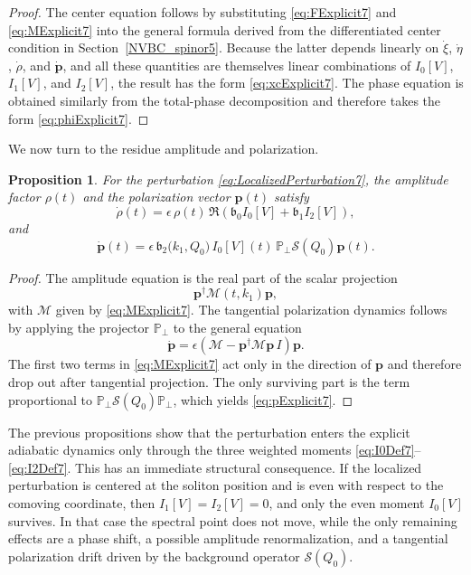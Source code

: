 \documentclass[11pt]{amsart}
\newtheorem{proposition}{Proposition}[section]
\theoremstyle{definition}
\numberwithin{equation}{section}
\begin{document}
\begin{proof}
The center equation follows by substituting \eqref{eq:FExplicit7} and \eqref{eq:MExplicit7} into the general formula derived from the differentiated center condition in Section~\ref{NVBC_spinor5}. Because the latter depends linearly on $\dot\xi$, $\dot\eta$, $\dot\rho$, and $\dot{\mathbf p}$, and all these quantities are themselves linear combinations of $I_0[V]$, $I_1[V]$, and $I_2[V]$, the result has the form \eqref{eq:xcExplicit7}. The phase equation is obtained similarly from the total-phase decomposition and therefore takes the form \eqref{eq:phiExplicit7}.
\end{proof}

We now turn to the residue amplitude and polarization.

\begin{proposition}
For the perturbation \eqref{eq:LocalizedPerturbation7}, the amplitude factor $\rho(t)$ and the polarization vector $\mathbf p(t)$ satisfy
\begin{equation}
\dot{\rho}(t)
=
\epsilon\,\rho(t)\,
\Re\!\left(
\mathfrak{b}_0 I_0[V]
+
\mathfrak{b}_1 I_2[V]
\right),
\label{eq:rhoExplicit7}
\end{equation}
and
\begin{equation}
\dot{\mathbf p}(t)
=
\epsilon\,\mathfrak{b}_2\bigl(k_1,Q_0\bigr)\,I_0[V](t)\,
\mathbb P_\perp \mathcal S(Q_0)\mathbf p(t).
\label{eq:pExplicit7}
\end{equation}
\end{proposition}

\begin{proof}
The amplitude equation is the real part of the scalar projection
\[
\mathbf p^\dagger \mathcal M(t,k_1)\mathbf p,
\]
with $\mathcal M$ given by \eqref{eq:MExplicit7}. The tangential polarization dynamics follows by applying the projector $\mathbb P_\perp$ to the general equation
\[
\dot{\mathbf p}
=
\epsilon\left(
\mathcal M-\mathbf p^\dagger \mathcal M\mathbf p\,I
\right)\mathbf p.
\]
The first two terms in \eqref{eq:MExplicit7} act only in the direction of $\mathbf p$ and therefore drop out after tangential projection. The only surviving part is the term proportional to $\mathbb P_\perp \mathcal S(Q_0)\mathbb P_\perp$, which yields \eqref{eq:pExplicit7}.
\end{proof}

The previous propositions show that the perturbation enters the explicit adiabatic dynamics only through the three weighted moments \eqref{eq:I0Def7}--\eqref{eq:I2Def7}. This has an immediate structural consequence. If the localized perturbation is centered at the soliton position and is even with respect to the comoving coordinate, then $I_1[V]=I_2[V]=0$, and only the even moment $I_0[V]$ survives. In that case the spectral point does not move, while the only remaining effects are a phase shift, a possible amplitude renormalization, and a tangential polarization drift driven by the background operator $\mathcal S(Q_0)$.
\end{document}
